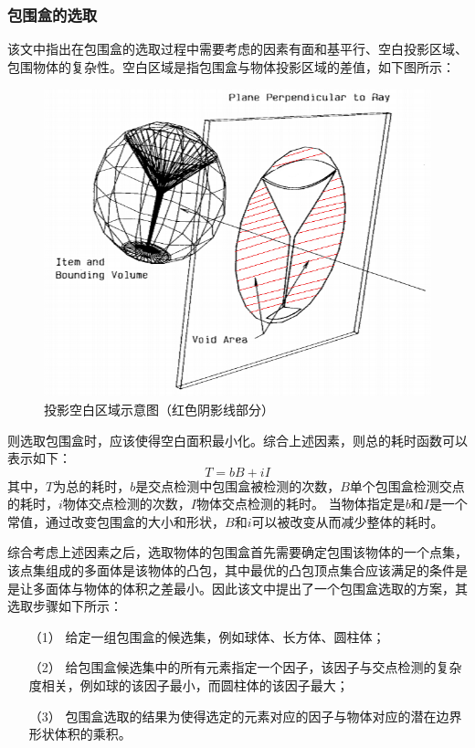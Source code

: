 \documentclass[11pt]{article}
\begin{document}
\subsubsection{包围盒的选取}
该文中指出在包围盒的选取过程中需要考虑的因素有面和基平行、空白投影区域、包围物体的复杂性。空白区域是指包围盒与物体投影区域的差值，如下图所示：
\begin{figure}[H]
\begin{center}
\includegraphics[scale=0.6]{void_area.png}
\caption{投影空白区域示意图（红色阴影线部分）}
\end{center}
\end{figure}
则选取包围盒时，应该使得空白面积最小化。综合上述因素，则总的耗时函数可以表示如下：
$$T=bB+iI$$
其中，$T$为总的耗时，$b$是交点检测中包围盒被检测的次数，$B$单个包围盒检测交点的耗时，$i$物体交点检测的次数，$I$物体交点检测的耗时。
当物体指定是$b$和$I$是一个常值，通过改变包围盒的大小和形状，$B$和$i$可以被改变从而减少整体的耗时。
\par 综合考虑上述因素之后，选取物体的包围盒首先需要确定包围该物体的一个点集，该点集组成的多面体是该物体的凸包，其中最优的凸包顶点集合应该满足的条件是是让多面体与物体的体积之差最小。因此该文中提出了一个包围盒选取的方案，其选取步骤如下所示：
\begin{itemize}
\item[（1）]{给定一组包围盒的候选集，例如球体、长方体、圆柱体；}
\item[（2）]{给包围盒候选集中的所有元素指定一个因子，该因子与交点检测的复杂度相关，例如球的该因子最小，而圆柱体的该因子最大；}
\item[（3）]{包围盒选取的结果为使得选定的元素对应的因子与物体对应的潜在边界形状体积的乘积。}
\end{itemize}
\end{document}
